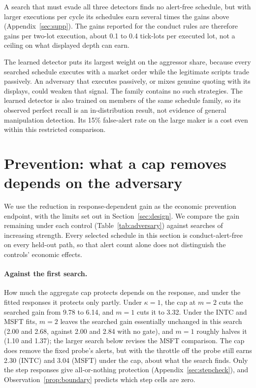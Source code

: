 \documentclass{article}
\begin{document}
A search that must evade all three detectors finds no alert-free schedule, but with larger executions per cycle its schedules earn several times the gains above (Appendix~\ref{sec:supp}). The gains reported for the conduct rules are therefore gains per two-lot execution, about 0.1 to 0.4 tick-lots per executed lot, not a ceiling on what displayed depth can earn.

The learned detector puts its largest weight on the aggressor share, because every searched schedule executes with a market order while the legitimate scripts trade passively. An adversary that executes passively, or mixes genuine quoting with its displays, could weaken that signal. The family contains no such strategies. The learned detector is also trained on members of the same schedule family, so its observed perfect recall is an in-distribution result, not evidence of general manipulation detection. Its 15\% false-alert rate on the large maker is a cost even within this restricted comparison.

\section{Prevention: what a cap removes depends on the adversary}\label{sec:prevention}

We use the reduction in response-dependent gain as the economic prevention endpoint, with the limits set out in Section~\ref{sec:design}. We compare the gain remaining under each control (Table~\ref{tab:adversary}) against searches of increasing strength. Every selected schedule in this section is conduct-alert-free on every held-out path, so that alert count alone does not distinguish the controls' economic effects.

\paragraph{Against the first search.} How much the aggregate cap protects depends on the response, and under the fitted responses it protects only partly. Under $\kappa = 1$, the cap at $m = 2$ cuts the searched gain from 9.78 to 6.14, and $m = 1$ cuts it to 3.32. Under the INTC and MSFT fits, $m = 2$ leaves the searched gain essentially unchanged in this search (2.00 and 2.68, against 2.00 and 2.84 with no gate), and $m = 1$ roughly halves it (1.10 and 1.37); the larger search below revises the MSFT comparison. The cap does remove the fixed probe's alerts, but with the throttle off the probe still earns 2.30 (INTC) and 3.04 (MSFT) under the cap, about what the search finds. Only the step responses give all-or-nothing protection (Appendix~\ref{sec:stepcheck}), and Observation~\ref{prop:boundary} predicts which step cells are zero.
\end{document}
